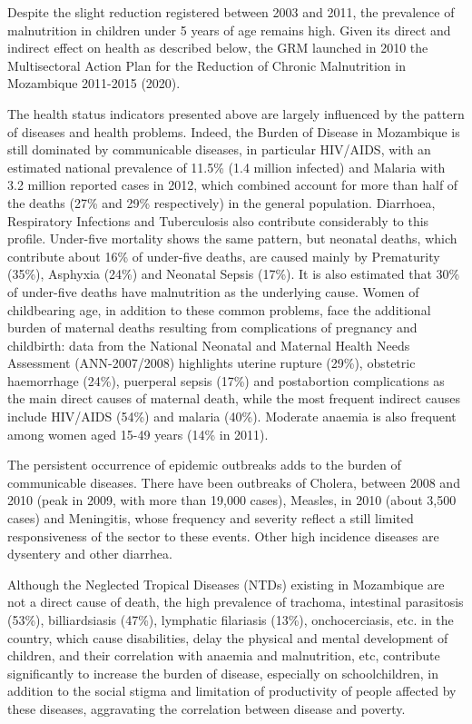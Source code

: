\documentclass[
]{book}
\begin{document}
Despite the slight reduction registered between 2003 and 2011, the prevalence of malnutrition in children under 5 years of age remains high. Given its direct and indirect effect on health as described below, the GRM launched in 2010 the Multisectoral Action Plan for the Reduction of Chronic Malnutrition in Mozambique 2011-2015 (2020).

The health status indicators presented above are largely influenced by the pattern of diseases and health problems. Indeed, the Burden of Disease in Mozambique is still dominated by communicable diseases, in particular HIV/AIDS, with an estimated national prevalence of 11.5\% (1.4 million infected) and Malaria with 3.2 million reported cases in 2012, which combined account for more than half of the deaths (27\% and 29\% respectively) in the general population. Diarrhoea, Respiratory Infections and Tuberculosis also contribute considerably to this profile. Under-five mortality shows the same pattern, but neonatal deaths, which contribute about 16\% of under-five deaths, are caused mainly by Prematurity (35\%), Asphyxia (24\%) and Neonatal Sepsis (17\%). It is also estimated that 30\% of under-five deaths have malnutrition as the underlying cause. Women of childbearing age, in addition to these common problems, face the additional burden of maternal deaths resulting from complications of pregnancy and childbirth: data from the National Neonatal and Maternal Health Needs Assessment (ANN-2007/2008) highlights uterine rupture (29\%), obstetric haemorrhage (24\%), puerperal sepsis (17\%) and postabortion complications as the main direct causes of maternal death, while the most frequent indirect causes include HIV/AIDS (54\%) and malaria (40\%). Moderate anaemia is also frequent among women aged 15-49 years (14\% in 2011).

The persistent occurrence of epidemic outbreaks adds to the burden of communicable diseases. There have been outbreaks of Cholera, between 2008 and 2010 (peak in 2009, with more than 19,000 cases), Measles, in 2010 (about 3,500 cases) and Meningitis, whose frequency and severity reflect a still limited responsiveness of the sector to these events. Other high incidence diseases are dysentery and other diarrhea.

Although the Neglected Tropical Diseases (NTDs) existing in Mozambique are not a direct cause of death, the high prevalence of trachoma, intestinal parasitosis (53\%), billiardsiasis (47\%), lymphatic filariasis (13\%), onchocerciasis, etc. in the country, which cause disabilities, delay the physical and mental development of children, and their correlation with anaemia and malnutrition, etc, contribute significantly to increase the burden of disease, especially on schoolchildren, in addition to the social stigma and limitation of productivity of people affected by these diseases, aggravating the correlation between disease and poverty.
\end{document}
